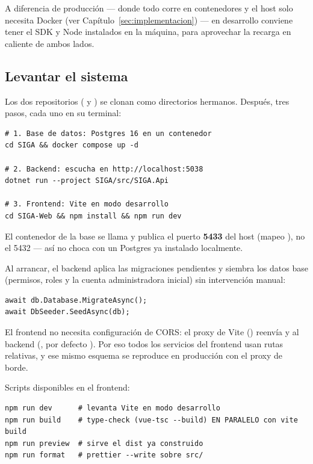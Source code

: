 A diferencia de producción --- donde todo corre en contenedores y el host solo necesita Docker (ver Capítulo~\ref{sec:implementacion}) --- en desarrollo conviene tener el SDK y Node instalados en la máquina, para aprovechar la recarga en caliente de ambos lados.

\subsection{Levantar el sistema}
\label{sec:mt-levantar}

Los dos repositorios ( y ) se clonan como directorios hermanos. Después, tres pasos, cada uno en su terminal:

\newpage
\begin{lstlisting}[numbers=none]
# 1. Base de datos: Postgres 16 en un contenedor
cd SIGA && docker compose up -d

# 2. Backend: escucha en http://localhost:5038
dotnet run --project SIGA/src/SIGA.Api

# 3. Frontend: Vite en modo desarrollo
cd SIGA-Web && npm install && npm run dev
\end{lstlisting}

El contenedor de la base se llama  y publica el puerto \textbf{5433} del host (mapeo ), no el 5432 --- así no choca con un Postgres ya instalado localmente.

Al arrancar, el backend aplica las migraciones pendientes y siembra los datos base (permisos, roles y la cuenta administradora inicial) sin intervención manual:

\begin{lstlisting}[numbers=none]
await db.Database.MigrateAsync();
await DbSeeder.SeedAsync(db);
\end{lstlisting}

El frontend no necesita configuración de CORS: el proxy de Vite () reenvía  y  al backend (, por defecto \allowbreak \code{/}\allowbreak {}). Por eso todos los servicios del frontend usan rutas relativas, y ese mismo esquema se reproduce en producción con el proxy de borde.

Scripts disponibles en el frontend:

\begin{lstlisting}[numbers=none]
npm run dev      # levanta Vite en modo desarrollo
npm run build    # type-check (vue-tsc --build) EN PARALELO con vite build
npm run preview  # sirve el dist ya construido
npm run format   # prettier --write sobre src/
\end{lstlisting}

